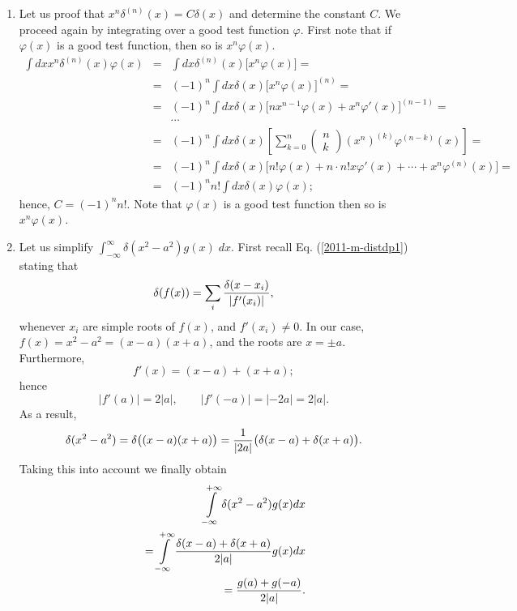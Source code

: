 {\begin{enumerate}
\item
Let us proof that
$x^n\delta^{(n)}(x)=C\delta (x)$    and determine the constant $C$.
We proceed again by integrating over a good test function $\varphi$.
First note that if
$\varphi (x)$ is a good test function, then so is
$x^n\varphi (x)$.
\begin{eqnarray*}
   \int dx x^n\delta^{(n)}(x)\varphi(x)&=&
   \int dx \delta^{(n)}(x)\bigl[x^n\varphi(x)\bigr]=\\
   &=&(-1)^n \int dx \delta(x)\bigl[x^n\varphi(x)\bigr]^{(n)}=\\
   &=&(-1)^n \int dx \delta(x)\bigl[nx^{n-1}\varphi(x)+x^n\varphi'(x)
   \bigr]^{(n-1)}=                                              \\
&&\cdots \\
   &=&(-1)^n \int dx \delta(x)\left[\sum_{k=0}^n
           \left(
          \begin{array}{c}
          n\\ k
           \end{array}\right) (x^n)^{(k)}\varphi ^{(n-k)}(x)\right]
   =\\
   &=&(-1)^n \int dx
\delta(x)\bigl[n!\varphi(x)+n\cdot n!x\varphi'(x) +
\cdots +x^n\varphi^{(n)}(x)
   \bigr]=\\
   &=&(-1)^n n! \int dx \delta(x)\varphi(x);
\end{eqnarray*}
hence, $ C=(-1)^n n!$.
Note that
$\varphi (x)$ is a good test function then so is
$x^n\varphi (x)$.

\item
Let us simplify $\int_{-\infty}^\infty \delta (x^2-a^2)g(x)\; dx$.
First recall Eq. (\ref{2011-m-distdp1})  stating that
$$
   \delta(f(x))=\sum_{i}{\delta(x-x_i)\over|f'(x_i)|},
$$
whenever $x_i$ are simple roots of  $f(x)$, and $f'(x_i)\neq 0$.
In our case, $
   f(x)=x^2-a^2=(x-a)(x+a)
$, and the roots are  $x=\pm a$.
Furthermore,
$$
   f'(x)=(x-a)+(x+a);
$$
hence
$$
   |f'(a)|=2|a|,\qquad |f'(-a)|=|-2a|=2|a|.
$$
As a result,
$$
    \delta(x^2-a^2)=\delta\bigl((x-a)(x+a)\bigr)={1\over|2a|}
   \bigl(\delta(x-a)+\delta(x+a)\bigr).
$$
Taking this into account we finally obtain
 \begin{equation}
\begin{split}
  \int\limits_{-\infty}^{+\infty}\delta(x^2-a^2)
   g(x)dx\\
\qquad =
\int\limits_{-\infty}^{+\infty}{\delta(x-a)+\delta(x+a)\over
   2|a|}g(x)dx\\
\qquad =    {g(a)+g(-a)\over2|a|}.
\end{split}
\end{equation}



\end{enumerate}}
